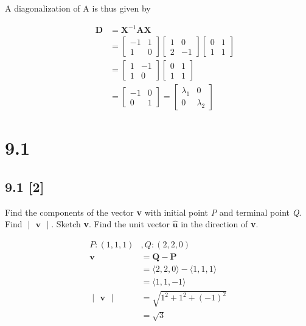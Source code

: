 \documentclass{article}
\begin{document}
A diagonalization of A is thus given by

\begin{align}
    && \textbf{D} &= \textbf{X}^{-1}\textbf{AX}
    \\
    && &= \begin{bmatrix}
    -1 & 1\\
    1 & 0
    \end{bmatrix} \begin{bmatrix}
    1 & 0 \\ 2 & -1
    \end{bmatrix} \begin{bmatrix}
    0 & 1 \\ 1 & 1
    \end{bmatrix}
    \\
    && &= \begin{bmatrix}
    1 & -1\\ 1 & 0
    \end{bmatrix} \begin{bmatrix}
    0 & 1 \\ 1 & 1
    \end{bmatrix}
    \\
    && &= \begin{bmatrix}
    -1 & 0 \\ 0 & 1 
    \end{bmatrix} = \begin{bmatrix}
    \lambda_1 & 0\\ 0 & \lambda_2
    \end{bmatrix}
\end{align}

\newpage

\section*{9.1}
\setcounter{equation}{0}

\subsection*{9.1 [2]}
\setcounter{equation}{0}

Find the components of the vector \textbf{v} with initial point \textit{P} and terminal point \textit{Q}.  Find $\begin{vmatrix}
\textbf{v}
\end{vmatrix}$.  Sketch \textbf{v}.  Find the unit vector $\hat{\textbf{u}}$ in the direction of \textbf{v}.

\begin{align}
    P: (1, 1, 1)&, Q: (2, 2, 0)
    \\
    \textbf{v} &= \textbf{Q} - \textbf{P}
    \\
    &= \langle2, 2, 0\rangle - \langle1, 1, 1\rangle
    \\ 
    &= \langle1, 1, -1\rangle
    \\
    \begin{vmatrix}
    \textbf{v}
    \end{vmatrix} &= \sqrt{1^2 + 1^2 + (-1)^2}
    \\
    &= \sqrt{3}
\end{align}
\end{document}
